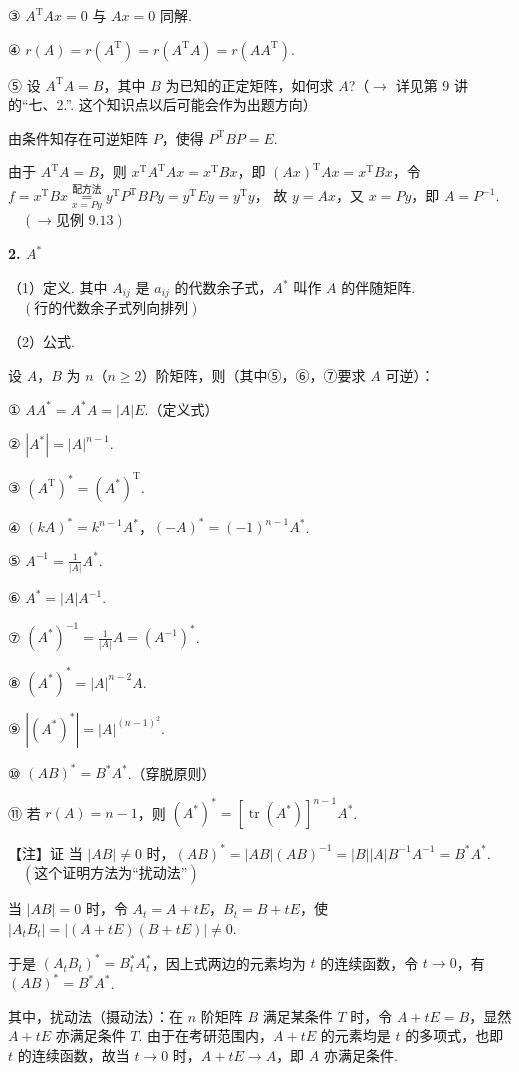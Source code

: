 ③ $A^{\mathrm T}Ax=0$ 与 $Ax=0$ 同解.

④ $r(A)=r(A^{\mathrm T})=r(A^{\mathrm T}A)=r(AA^{\mathrm T})$.

⑤ 设 $A^{\mathrm T}A=B$，其中 $B$ 为已知的正定矩阵，如何求 $A$?（$\to$ 详见第 9 讲的“七、2.”. 这个知识点以后可能会作为出题方向）

由条件知存在可逆矩阵 $P$，使得 $P^{\mathrm T}BP=E$.

由于 $A^{\mathrm T}A=B$，则 $x^{\mathrm T}A^{\mathrm T}Ax=x^{\mathrm T}Bx$，即 $(Ax)^{\mathrm T}Ax=x^{\mathrm T}Bx$，令 $f=x^{\mathrm T}Bx\overset{\text{配方法}}{\underset{x=Py}{=}}y^{\mathrm T}P^{\mathrm T}BPy=y^{\mathrm T}Ey=y^{\mathrm T}y$，
故 $y=Ax$，又 $x=Py$，即 $A=P^{-1}$. $\quad(\to\text{见例 9.13})$

\textbf{2. $A^*$}

（1）定义.
其中 $A_{ij}$ 是 $a_{ij}$ 的代数余子式，$A^*$ 叫作 $A$ 的伴随矩阵. $\quad(\text{行的代数余子式列向排列})$

（2）公式.

设 $A$，$B$ 为 $n$（$n\ge2$）阶矩阵，则（其中⑤，⑥，⑦要求 $A$ 可逆）：

① $AA^*=A^*A=|A|E$.（定义式）

② $|A^*|=|A|^{n-1}$.

③ $(A^{\mathrm T})^*=(A^*)^{\mathrm T}$.


④ $(kA)^*=k^{n-1}A^*$，$(-A)^*=(-1)^{n-1}A^*$.

⑤ $A^{-1}=\frac{1}{|A|}A^*$.

⑥ $A^*=|A|A^{-1}$.

⑦ $(A^*)^{-1}=\frac{1}{|A|}A=(A^{-1})^*$.

⑧ $(A^*)^*=|A|^{n-2}A$.

⑨ $|(A^*)^*|=|A|^{(n-1)^2}$.

⑩ $(AB)^*=B^*A^*$.（穿脱原则）

⑪ 若 $r(A)=n-1$，则 $(A^*)^*=[\operatorname{tr}(A^*)]^{n-1}A^*$.

\begin{fnote}
【注】证 当 $|AB|\ne0$ 时，$(AB)^*=|AB|(AB)^{-1}=|B||A|B^{-1}A^{-1}=B^*A^*$. $\quad(\text{这个证明方法为“扰动法”})$

当 $|AB|=0$ 时，令 $A_t=A+tE$，$B_t=B+tE$，使 $|A_tB_t|=|(A+tE)(B+tE)|\ne0$.

于是 $(A_tB_t)^*=B_t^*A_t^*$，因上式两边的元素均为 $t$ 的连续函数，令 $t\to0$，有 $(AB)^*=B^*A^*$.

其中，扰动法（摄动法）：在 $n$ 阶矩阵 $B$ 满足某条件 $T$ 时，令 $A+tE=B$，显然 $A+tE$ 亦满足条件 $T$. 由于在考研范围内，$A+tE$ 的元素均是 $t$ 的多项式，也即 $t$ 的连续函数，故当 $t\to0$ 时，$A+tE\to A$，即 $A$ 亦满足条件.
\end{fnote}

